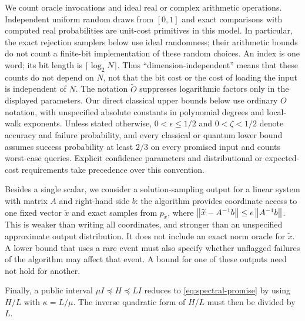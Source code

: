 We count oracle invocations and ideal real or complex arithmetic operations.
Independent uniform random draws from $[0,1]$ and exact comparisons with
computed real probabilities are unit-cost primitives in this model.
In particular, the exact rejection samplers below use ideal randomness;
their arithmetic bounds do not count a finite-bit implementation of these
random choices.
An index is one word; its bit length is $\lceil\log_2N\rceil$. Thus
``dimension-independent'' means that these counts do not depend on $N$,
not that the bit cost or the cost of loading the input is independent
of $N$. The notation
$\widetilde O$ suppresses logarithmic factors only in the displayed
parameters. Our direct classical upper bounds below use ordinary $O$
notation, with unspecified absolute constants in polynomial degrees and
local-walk exponents. Unless stated otherwise, $0<\epsilon\leq1/2$ and
$0<\zeta<1/2$ denote accuracy and failure probability, and every
classical or quantum lower bound assumes success probability at least $2/3$ on every promised input and
counts worst-case queries. Explicit
confidence parameters and distributional or expected-cost requirements
take precedence over this convention.

Besides a single scalar, we consider a solution-sampling output for a
linear system with matrix $A$ and right-hand side $b$: the algorithm
provides coordinate access to one fixed vector $\widetilde x$
and exact samples from $p_{\widetilde x}$, where
$\left\lVert\widetilde x-A^{-1}b\right\rVert\leq\epsilon\left\lVert A^{-1}b\right\rVert$.
This is weaker than writing all coordinates, and stronger than
an unspecified approximate output distribution. It does not
include an exact norm oracle for $\widetilde x$. A lower bound that uses
a rare event must also specify whether unflagged failures of the
algorithm may affect that event. A bound for one of these outputs need
not hold for another.

Finally, a public interval $\mu I\preceq H\preceq LI$ reduces to
\eqref{eq:spectral-promise} by using $H/L$ with $\kappa=L/\mu$.
The inverse quadratic form of $H/L$ must then be divided by $L$.
